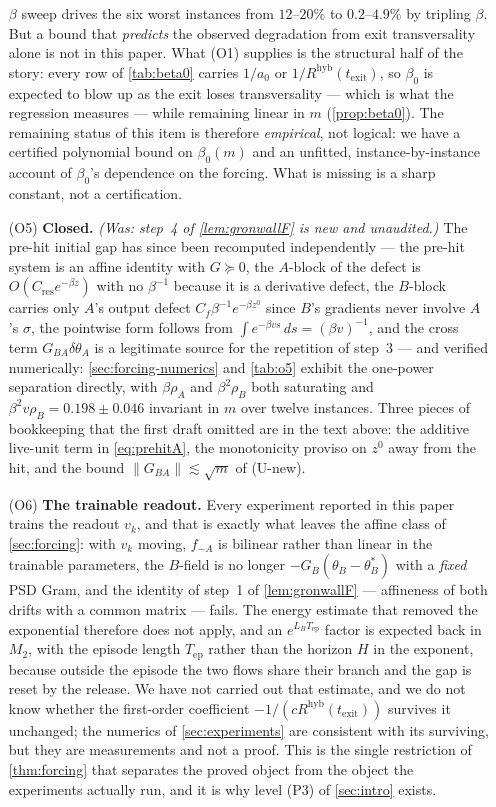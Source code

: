 \documentclass[11pt]{article}
\theoremstyle{definition}
\theoremstyle{remark}
\newcommand{\texit}{t_{\mathrm{exit}}}
\newcommand{\Tep}{T_{\mathrm{ep}}}   %
\newcommand{\hyb}{\mathrm{hyb}}
\begin{document}
\begin{enumerate}
$\beta$ sweep drives the six worst instances from $12$--$20\%$ to $0.2$--$4.9\%$
by tripling $\beta$. But a bound that \emph{predicts} the observed degradation
from exit transversality alone is not in this paper. What (O1) supplies is the
structural half of the story: every row of \cref{tab:beta0} carries $1/a_0$ or
$1/R^{\hyb}(\texit)$, so $\beta_0$ is expected to blow up as the exit loses
transversality --- which is what the regression measures --- while remaining
linear in $m$ (\cref{prop:beta0}). The remaining status of this item is
therefore \emph{empirical}, not logical: we have a certified polynomial bound on
$\beta_0(m)$ and an unfitted, instance-by-instance account of $\beta_0$'s
dependence on the forcing. What is missing is a sharp constant, not a
certification.
\item[(O5)] \textbf{Closed.} \emph{(Was: step~4 of \cref{lem:gronwallF} is new
and unaudited.)} The pre-hit initial gap has since been recomputed
independently --- the pre-hit system is an affine identity with $G\succeq0$, the
$A$-block of the defect is $O(C_{\mathrm{res}}e^{-\beta z})$ with no
$\beta^{-1}$ because it is a derivative defect, the $B$-block carries only $A$'s
output defect $C_f\beta^{-1}e^{-\beta z^0}$ since $B$'s gradients never involve
$A$'s $\sigma$, the pointwise form follows from
$\int e^{-\beta v s}\,ds=(\beta v)^{-1}$, and the cross term
$G_{BA}\delta\theta_A$ is a legitimate source for the repetition of step~3 ---
and verified numerically: \cref{sec:forcing-numerics} and \cref{tab:o5} exhibit
the one-power separation directly, with $\beta\rho_A$ and $\beta^2\rho_B$ both
saturating and $\beta^2v\rho_B=0.198\pm0.046$ invariant in $m$ over twelve
instances. Three pieces of bookkeeping that the first draft omitted are in the
text above: the additive live-unit term in \eqref{eq:prehitA}, the monotonicity
proviso on $z^0$ away from the hit, and the bound $\|G_{BA}\|\lesssim\sqrt m$ of
(U-new).
\item[(O6)] \textbf{The trainable readout.} Every experiment reported in this
paper trains the readout $v_k$, and that is exactly what leaves the affine class
of \cref{sec:forcing}: with $v_k$ moving, $f_{-A}$ is bilinear rather than
linear in the trainable parameters, the $B$-field is no longer
$-G_B(\theta_B-\theta_B^\ast)$ with a \emph{fixed} PSD Gram, and the identity of
step~1 of \cref{lem:gronwallF} --- affineness of both drifts with a common
matrix --- fails. The energy estimate that removed the exponential therefore
does not apply, and an $e^{L_B\Tep}$ factor is expected back in $M_2$, with the
episode length $\Tep$ rather than the horizon $H$ in the exponent, because
outside the episode the two flows share their branch and the gap is reset by the
release. We have not carried out that estimate, and we do not know whether the
first-order coefficient $-1/(cR^{\hyb}(\texit))$ survives it unchanged; the
numerics of \cref{sec:experiments} are consistent with its surviving, but they
are measurements and not a proof. This is the single restriction of
\cref{thm:forcing} that separates the proved object from the object the
experiments actually run, and it is why level (P3) of \cref{sec:intro} exists.
\end{enumerate}
\end{document}
